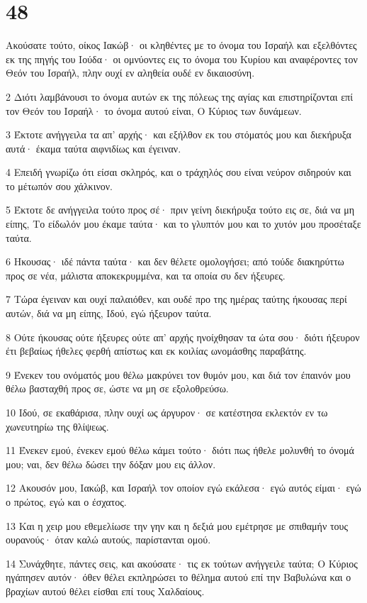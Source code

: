 \chapter{48}

\par Ακούσατε τούτο, οίκος Ιακώβ· οι κληθέντες με το όνομα του Ισραήλ και εξελθόντες εκ της πηγής του Ιούδα· οι ομνύοντες εις το όνομα του Κυρίου και αναφέροντες τον Θεόν του Ισραήλ, πλην ουχί εν αληθεία ουδέ εν δικαιοσύνη.
\par 2 Διότι λαμβάνουσι το όνομα αυτών εκ της πόλεως της αγίας και επιστηρίζονται επί τον Θεόν του Ισραήλ· το όνομα αυτού είναι, Ο Κύριος των δυνάμεων.
\par 3 Έκτοτε ανήγγειλα τα απ' αρχής· και εξήλθον εκ του στόματός μου και διεκήρυξα αυτά· έκαμα ταύτα αιφνιδίως και έγειναν.
\par 4 Επειδή γνωρίζω ότι είσαι σκληρός, και ο τράχηλός σου είναι νεύρον σιδηρούν και το μέτωπόν σου χάλκινον.
\par 5 Έκτοτε δε ανήγγειλα τούτο προς σέ· πριν γείνη διεκήρυξα τούτο εις σε, διά να μη είπης, Το είδωλόν μου έκαμε ταύτα· και το γλυπτόν μου και το χυτόν μου προσέταξε ταύτα.
\par 6 Ηκουσας· ιδέ πάντα ταύτα· και δεν θέλετε ομολογήσει; από τούδε διακηρύττω προς σε νέα, μάλιστα αποκεκρυμμένα, και τα οποία συ δεν ήξευρες.
\par 7 Τώρα έγειναν και ουχί παλαιόθεν, και ουδέ προ της ημέρας ταύτης ήκουσας περί αυτών, διά να μη είπης, Ιδού, εγώ ήξευρον ταύτα.
\par 8 Ούτε ήκουσας ούτε ήξευρες ούτε απ' αρχής ηνοίχθησαν τα ώτα σου· διότι ήξευρον έτι βεβαίως ήθελες φερθή απίστως και εκ κοιλίας ωνομάσθης παραβάτης.
\par 9 Ένεκεν του ονόματός μου θέλω μακρύνει τον θυμόν μου, και διά τον έπαινόν μου θέλω βασταχθή προς σε, ώστε να μη σε εξολοθρεύσω.
\par 10 Ιδού, σε εκαθάρισα, πλην ουχί ως άργυρον· σε κατέστησα εκλεκτόν εν τω χωνευτηρίω της θλίψεως.
\par 11 Ένεκεν εμού, ένεκεν εμού θέλω κάμει τούτο· διότι πως ήθελε μολυνθή το όνομά μου; ναι, δεν θέλω δώσει την δόξαν μου εις άλλον.
\par 12 Ακουσόν μου, Ιακώβ, και Ισραήλ τον οποίον εγώ εκάλεσα· εγώ αυτός είμαι· εγώ ο πρώτος, εγώ και ο έσχατος.
\par 13 Και η χειρ μου εθεμελίωσε την γην και η δεξιά μου εμέτρησε με σπιθαμήν τους ουρανούς· όταν καλώ αυτούς, παρίστανται ομού.
\par 14 Συνάχθητε, πάντες σεις, και ακούσατε· τις εκ τούτων ανήγγειλε ταύτα; Ο Κύριος ηγάπησεν αυτόν· όθεν θέλει εκπληρώσει το θέλημα αυτού επί την Βαβυλώνα και ο βραχίων αυτού θέλει είσθαι επί τους Χαλδαίους.
